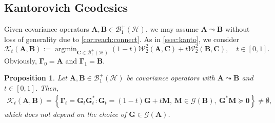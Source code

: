 \documentclass[noinfoline]{imsart}\setcounter{tocdepth}{2}
\newcommand{\m}[1]{\mathbf{#1}} %
\newcommand{\s}[1]{\mathscr{#1}} %
\renewcommand{\c}[1]{\mathcal{#1}} %
\DeclareMathOperator*{\argmin}{\arg\min}
\theoremstyle{plain}
\newtheorem{proposition}[theorem]{Proposition}
\begin{document}
\subsection{Kantorovich Geodesics}
Given covariance operators $\m{A}, \m{B} \in \c{B}_{1}^{+}(\c{H})$, we may assume $\m{A} \leadsto \m{B}$ without loss of generality due to \cref{cor:reach:connect}. As in \cref{ssec:kanto}, we consider
\begin{equation*}
    \c{K}_{t}(\m{A}, \m{B}) := \argmin_{\m{C} \in \c{B}_{1}^{+}(\c{H})}  (1-t) \c{W}_{2}^{2}(\m{A}, \m{C}) + t \c{W}_{2}^{2}(\m{B}, \m{C}), \quad t \in [0, 1].
\end{equation*}
Obviously, $\m{\Gamma}_{0} = \m{A}$ and $\m{\Gamma}_{1} = \m{B}$. 

\begin{proposition}\label{prop:Kanto:geo:inf}
Let $\m{A}, \m{B} \in \c{B}_{1}^{+}(\c{H})$ be covariance operators with $\m{A} \leadsto \m{B}$ and $t \in [0, 1]$. Then, 
\begin{align*}
    \c{K}_{t}(\m{A}, \m{B}) = \left\{ \m{\Gamma}_{t} = \m{G}_{t} \m{G}_{t}^{*} : \m{G}_{t} = (1-t) \m{G} + t \m{M}, \, \m{M} \in \s{G}(\m{B}), \ \m{G}^{*} \m{M} \succeq \m{0} \right\} \ne \emptyset,
\end{align*}
which does not depend on the choice of $\m{G} \in \c{G}(\m{A})$.
\end{proposition}
\end{document}
